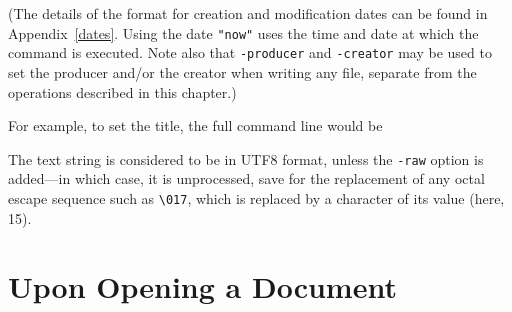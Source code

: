 \documentclass{book}
\begin{document}
\noindent{}


  \noindent (The details of the format for creation and modification dates can be found
in Appendix~\ref{dates}. Using the date \texttt{"now"} uses the time and date
at which the command is executed. Note also that \texttt{-producer} and \texttt{-creator} may be used to set the producer and/or the creator when writing any file, separate from the operations described in this chapter.)
  
  \vspace{2mm}
  For example, to set the title, the full command line would be

\noindent{}

\noindent The text string is considered to be in UTF8 format, unless the \texttt{-raw}
option is added---in which case, it is unprocessed, save for the replacement of any octal escape sequence such as \texttt{\textbackslash 017}, which is replaced by a character of its value (here, 15).


\section{Upon Opening a Document}
\end{document}
